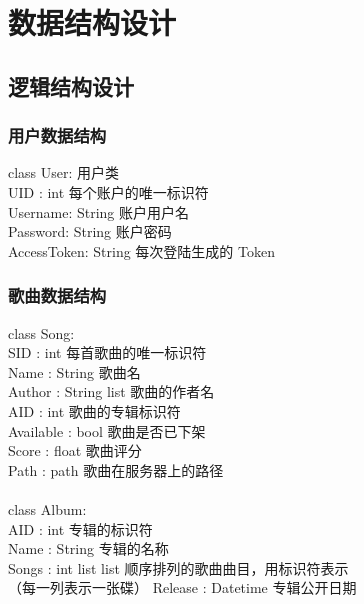 \chapter{数据结构设计}
\section{逻辑结构设计}
\subsection{用户数据结构}

class User:             用户类\\
\indent \indent    UID : int           每个账户的唯一标识符\\
\indent \indent    Username: String    账户用户名\\
\indent \indent    Password: String    账户密码\\
\indent \indent    AccessToken: String 每次登陆生成的 Token

\subsection{歌曲数据结构}


class Song:\\
\indent \indent   SID : int           每首歌曲的唯一标识符\\
\indent \indent   Name : String       歌曲名\\
\indent \indent   Author : String list 歌曲的作者名\\
\indent \indent   AID : int           歌曲的专辑标识符\\
\indent \indent   Available : bool    歌曲是否已下架\\
\indent \indent   Score : float       歌曲评分\\
\indent \indent   Path : path   歌曲在服务器上的路径\\
\\
class Album:\\
\indent \indent    AID : int           专辑的标识符\\
\indent \indent    Name : String       专辑的名称\\
\indent \indent    Songs : int list list   顺序排列的歌曲曲目，用标识符表示\\
\indent \indent                            （每一列表示一张碟）
\indent \indent    Release : Datetime  专辑公开日期


